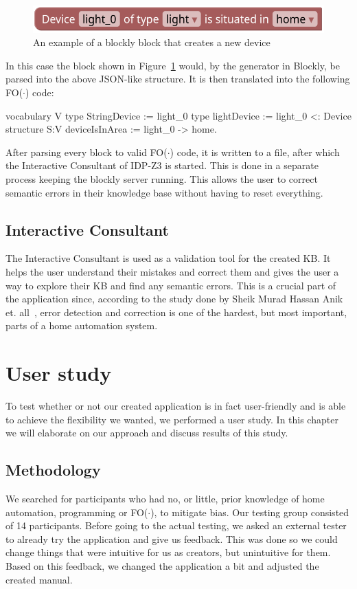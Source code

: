 \documentclass[11pt,a4paper]{report}
\newcommand{\fodot}{FO($\cdot$)\xspace}
\begin{document}
\begin{figure}
    \centering
    \includegraphics[width=0.8\linewidth]{images/blockly_new_device.png}
    \caption{An example of a blockly block that creates a new device}
    \label{fig:blockly_new_device}
\end{figure}

In this case the block shown in Figure~\ref{fig:blockly_new_device} would, by the generator in Blockly, be parsed into the above JSON-like structure. It is then translated into the following \fodot code:

\begin{idplisting}
vocabulary V {
    type StringDevice := {light_0}
    type lightDevice := {light_0} <: Device
}
structure S:V {
    deviceIsInArea := {light_0 -> home}.
}
\end{idplisting}

After parsing every block to valid \fodot code, it is written to a file, after which the Interactive Consultant of IDP-Z3 is started. This is done in a separate process keeping the blockly server running. This allows the user to correct semantic errors in their knowledge base without having to reset everything.

\section{Interactive Consultant}
The Interactive Consultant is used as a validation tool for the created KB. It helps the user understand their mistakes and correct them and gives the user a way to explore their KB and find any semantic errors. This is a crucial part of the application since, according to the study done by Sheik Murad Hassan Anik et. all~\cite{SOTA_AutomationConfigurationSmarthome}, error detection and correction is one of the hardest, but most important, parts of a home automation system.

\chapter{User study}
To test whether or not our created application is in fact user-friendly and is able to achieve the flexibility we wanted, we performed a user study. In this chapter we will elaborate on our approach and discuss results of this study.

\section{Methodology}
We searched for participants who had no, or little, prior knowledge of home automation, programming or \fodot, to mitigate bias. Our testing group consisted of 14 participants. Before going to the actual testing, we asked an external tester to already try the application and give us feedback. This was done so we could change things that were intuitive for us as creators, but unintuitive for them. Based on this feedback, we changed the application a bit and adjusted the created manual.
\end{document}
